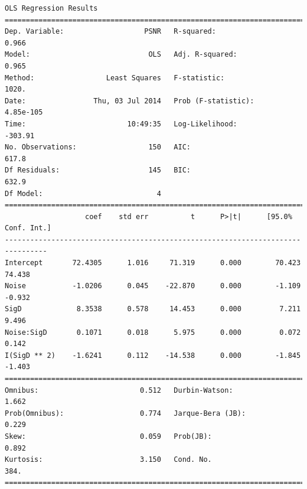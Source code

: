 \documentclass[11pt]{article}
\theoremstyle{definition}
\begin{document}
{\footnotesize
\begin{lstlisting}[caption = Time Series 1 - Gaussian Filter OLS Model, label = {gaussianfilterseries1}]
                            OLS Regression Results                            
==============================================================================
Dep. Variable:                   PSNR   R-squared:                       0.966
Model:                            OLS   Adj. R-squared:                  0.965
Method:                 Least Squares   F-statistic:                     1020.
Date:                Thu, 03 Jul 2014   Prob (F-statistic):          4.85e-105
Time:                        10:49:35   Log-Likelihood:                -303.91
No. Observations:                 150   AIC:                             617.8
Df Residuals:                     145   BIC:                             632.9
Df Model:                           4                                         
================================================================================
                   coef    std err          t      P>|t|      [95.0% Conf. Int.]
--------------------------------------------------------------------------------
Intercept       72.4305      1.016     71.319      0.000        70.423    74.438
Noise           -1.0206      0.045    -22.870      0.000        -1.109    -0.932
SigD             8.3538      0.578     14.453      0.000         7.211     9.496
Noise:SigD       0.1071      0.018      5.975      0.000         0.072     0.142
I(SigD ** 2)    -1.6241      0.112    -14.538      0.000        -1.845    -1.403
==============================================================================
Omnibus:                        0.512   Durbin-Watson:                   1.662
Prob(Omnibus):                  0.774   Jarque-Bera (JB):                0.229
Skew:                           0.059   Prob(JB):                        0.892
Kurtosis:                       3.150   Cond. No.                         384.
==============================================================================
\end{lstlisting}

}
\end{document}
